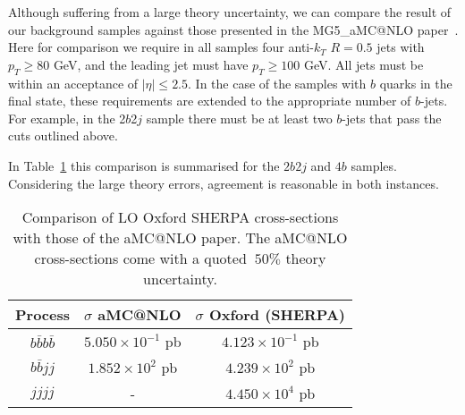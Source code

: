 Although suffering from a large theory uncertainty, we can compare the result of our background samples against those presented in the MG5\_aMC@NLO paper~\cite{Alwall:2014hca}.
Here for comparison we require in all samples four anti-$k_T$ $R=0.5$ jets with $p_T \ge 80 $ GeV, and the leading jet must have $p_T \ge 100$ GeV. All jets must be within an acceptance of $|\eta| \le 2.5 $. In the case of the samples with $b$ quarks in the final state, these requirements are extended to the appropriate number of $b$-jets. For example, in the 2$b$2$j$ sample there must be at least two $b$-jets that pass the cuts outlined above.

In Table~\ref{tab:xsecs} this comparison is summarised for the $2b2j$ and $4b$ samples. Considering the large theory errors, agreement is reasonable in both instances.

\begin{table}[h]
\begin{center}
\begin{tabular}{|c|c|c|}
\hline
Process & $\sigma$ aMC@NLO & $\sigma$ Oxford (SHERPA) \\
\hline\hline
$b\bar{b}b\bar{b}$ & $5.050 \times  10^{-1}$ pb & $4.123\times10^{-1}$ pb \\ 
$b\bar{b}jj$ & $1.852 \times 10^2$ pb &$4.239 \times 10^2$ pb \\ 
$jjjj$ & -  & $4.450\times 10^4$ pb \\
\hline
\end{tabular}
\caption{Comparison of LO Oxford SHERPA cross-sections with those of the aMC@NLO paper. The aMC@NLO cross-sections come with a quoted $~50\%$ theory uncertainty.} \label{tab:xsecs}
\end{center}
\end{table}%